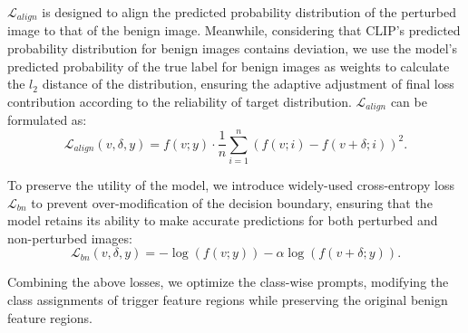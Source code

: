  $\mathcal{L}_{align}$ is designed to align the predicted probability distribution of the perturbed image to that of the benign image. Meanwhile, considering that CLIP's predicted probability distribution for benign images contains deviation, we use the model's predicted probability of the true label for benign images as weights to calculate the $l_2$ distance of the distribution, ensuring the adaptive adjustment of final loss contribution according to the reliability of target distribution. $\mathcal{L}_{align}$ can be formulated as:
\begin{equation}
    \mathcal{L}_{align}(v, \delta, y)=
    f(v;y)\cdot\frac{1}{n}\sum_{i=1}^{n}(f(v;i)-f(v+\delta;i))^2.
    \label{eq:loss_align}
\end{equation}

 To preserve the utility of the model, we introduce widely-used cross-entropy loss $\mathcal{L}_{bn}$ to prevent over-modification of the decision boundary, ensuring that the model retains its ability to make accurate predictions for both perturbed and non-perturbed images:
\begin{equation}
    \mathcal{L}_{bn}(v,\delta, y)=-\log(f(v;y))-\alpha\log(f(v+\delta;y)).
    \label{eq:loss_bn}
\end{equation}



Combining the above losses, we optimize the class-wise prompts, modifying the class assignments of trigger feature regions while preserving the original benign feature regions.

